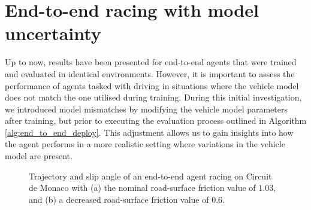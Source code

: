 
\section{End-to-end racing with model uncertainty}


Up to now, results have been presented for end-to-end agents that were trained and evaluated in identical environments. 
However, it is important to assess the performance of agents tasked with driving in situations where the vehicle model does not match the one utilised during training.
During this initial investigation, we introduced model mismatches by modifying the vehicle model parameters after training, but prior to executing the evaluation process outlined in Algorithm \ref{alg:end_to_end_deploy}. 
This adjustment allows us to gain insights into how the agent performs in a more realistic setting where variations in the vehicle model are present.

\begin{figure}[b]
    \centering
    \begin{subfigure}[htb!]{0.45\textwidth}
        \centering
        
        \caption{}
        \label{fig:no_error}
    \end{subfigure}
    \hfill
    \begin{subfigure}[htb!]{0.45\textwidth}
        \centering
        
        \caption{}
        \label{fig:error}
    \end{subfigure}
    \caption[Trajectory and slip angle of an end-to-end agent racing on Circuit de Monaco]{Trajectory and slip angle of an end-to-end agent racing on Circuit de Monaco with (a) the nominal road-surface friction value of $1.03$, and (b) a decreased road-surface friction value of $0.6$.}
    \label{fig:mco_slip}
\end{figure}


